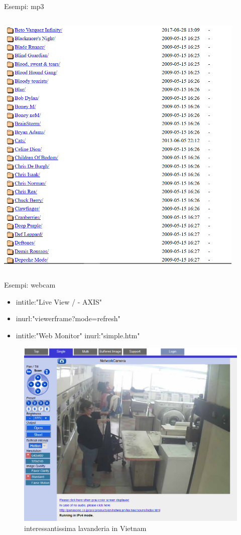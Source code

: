 \documentclass{beamer}
\begin{document}
\begin{frame}{Esempi: mp3}
\begin{columns}
\begin{column}{0.5\textwidth}
\begin{center}
     \includegraphics[width=0.9\textwidth]{immagini/list.png}
\end{center}
\end{column}
\end{columns}
\end{frame}

\begin{frame}{Esempi: webcam}
\begin{itemize}
\item \begin{center}intitle:"Live View / - AXIS"\end{center}
\item \begin{center}inurl:"viewerframe?mode=refresh"\end{center}
\item \begin{center}intitle:"Web Monitor" inurl:"simple.htm"\end{center}
\end{itemize}
\begin{figure}[h!]
\includegraphics[width = 0.5\linewidth]{immagini/webcam.png}
\caption{interessantissima lavanderia in Vietnam}
\end{figure}
\end{frame}
\end{document}
